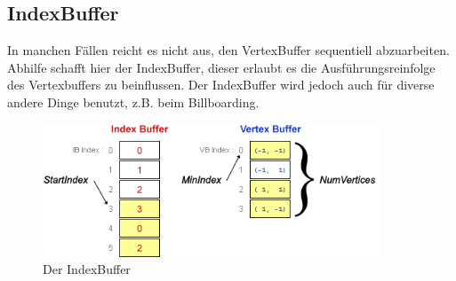 \begin{Spacing}{\mylinespace}
\subsection{IndexBuffer}
In manchen Fällen reicht es nicht aus, den VertexBuffer sequentiell abzuarbeiten. Abhilfe schafft hier der IndexBuffer, dieser erlaubt es die Ausführungsreinfolge des Vertexbuffers zu beinflussen.
Der IndexBuffer wird jedoch auch für diverse andere Dinge benutzt, z.B. beim Billboarding.
\begin{figure}[h!]
	\vspace*{30px}
	\centering
	\includegraphics[height=150px]{graphics/indexbuffer.png}	
	\caption{Der IndexBuffer\protect\footnotemark}
	\label{fig:IndexBuffer}
\end{figure}

\end{Spacing}
\clearpage
